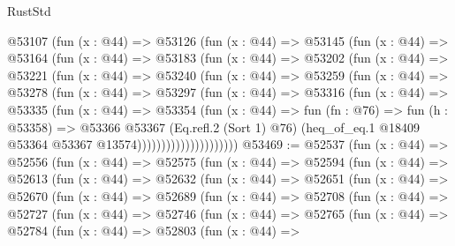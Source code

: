 \begin{lexlean}{RustStd}
\begin{coremodule}
              @53107
                (fun (x : @44) =>
                @53126
                  (fun (x : @44) =>
                  @53145
                    (fun (x : @44) =>
                    @53164
                      (fun (x : @44) =>
                      @53183
                        (fun (x : @44) =>
                        @53202
                          (fun (x : @44) =>
                          @53221
                            (fun (x : @44) =>
                            @53240
                              (fun (x : @44) =>
                              @53259
                                (fun (x : @44) =>
                                @53278
                                  (fun (x : @44) =>
                                  @53297
                                    (fun (x : @44) =>
                                    @53316
                                      (fun (x : @44) =>
                                      @53335
                                        (fun (x : @44) =>
                                        @53354
                                          (fun (x : @44) =>
                                          fun (fn : @76) =>
                                          fun (h : @53358) =>
                                          @53366
                                            @53367
                                            (Eq.refl.{2} (Sort 1) @76)
                                            (heq_of_eq.{1}
                                              @18409
                                              @53364
                                              @53367
                                              @13574)))))))))))))))))))))
@53469 := @52537
    (fun (x : @44) =>
    @52556
      (fun (x : @44) =>
      @52575
        (fun (x : @44) =>
        @52594
          (fun (x : @44) =>
          @52613
            (fun (x : @44) =>
            @52632
              (fun (x : @44) =>
              @52651
                (fun (x : @44) =>
                @52670
                  (fun (x : @44) =>
                  @52689
                    (fun (x : @44) =>
                    @52708
                      (fun (x : @44) =>
                      @52727
                        (fun (x : @44) =>
                        @52746
                          (fun (x : @44) =>
                          @52765
                            (fun (x : @44) =>
                            @52784
                              (fun (x : @44) =>
                              @52803
                                (fun (x : @44) =>

\end{coremodule}
\end{lexlean}
